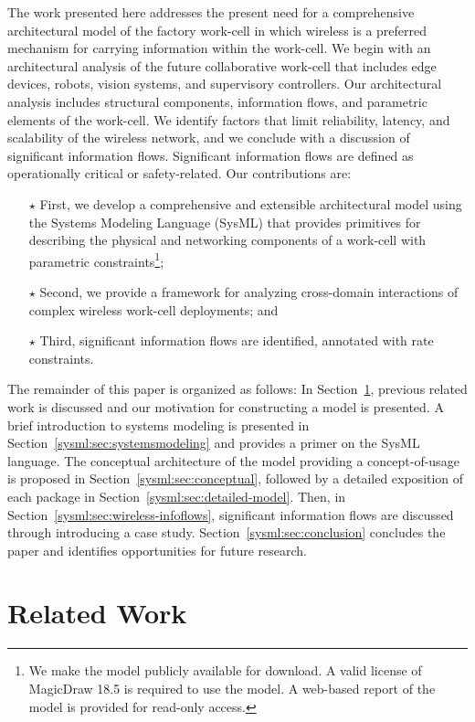The work presented here addresses the present need for a comprehensive architectural model of the factory work-cell in which wireless is a preferred mechanism for carrying information within the work-cell. We begin with an architectural analysis of the future collaborative work-cell that includes edge devices, robots, vision systems, and supervisory controllers. Our architectural analysis includes structural components, information flows, and parametric elements of the work-cell. We identify factors that limit reliability, latency, and scalability of the wireless network, and we conclude with a discussion of significant information flows. Significant information flows are defined as operationally critical or safety-related.  Our contributions are:

\begin{itemize}
	\item[$\star$] First, we develop a comprehensive and extensible architectural model using the Systems Modeling Language (SysML) that provides primitives for describing the physical and networking components of a work-cell with parametric constraints\footnote{We make the model publicly available for download. A valid license of MagicDraw 18.5 is required to use the model.  A web-based report of the model is provided for read-only access.};
	\item[$\star$] Second, we provide a framework for analyzing cross-domain interactions of complex wireless work-cell deployments; and
	\item[$\star$] Third, significant information flows are identified, annotated with rate constraints.
\end{itemize}

The remainder of this paper is organized as follows:  In Section~\ref{sysml:sec:related-work}, previous related work is discussed and our motivation for constructing a model is presented.  A brief introduction to systems modeling is presented in Section~\ref{sysml:sec:systemsmodeling} and provides a primer on the SysML language. The conceptual architecture of the model providing a concept-of-usage is proposed in Section~\ref{sysml:sec:conceptual}, followed by a detailed exposition of each package in Section~\ref{sysml:sec:detailed-model}.  Then, in Section~\ref{sysml:sec:wireless-infoflows}, significant information flows are discussed through introducing a case study. Section~\ref{sysml:sec:conclusion} concludes the paper and identifies opportunities for future research.

\section{Related Work}\label{sysml:sec:related-work}

